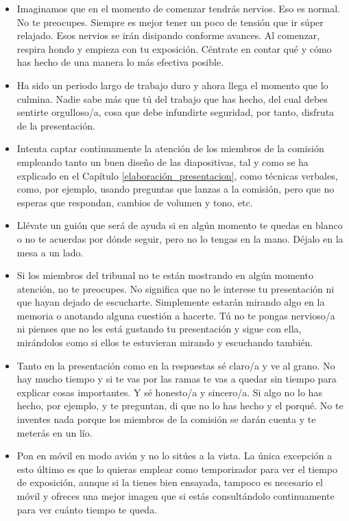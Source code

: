 \begin{itemize}
    \item Imaginamos que en el momento de comenzar tendrás nervios. Eso es normal. No te preocupes. Siempre es mejor tener un poco de tensión que ir súper relajado. Esos nervios se irán disipando conforme avances. Al comenzar, respira hondo y empieza con tu exposición. Céntrate en contar qué y cómo has hecho de una manera lo más efectiva posible.

    \item Ha sido un periodo largo de trabajo duro y ahora llega el momento que lo culmina. Nadie sabe más que tú del trabajo que has hecho, del cual debes sentirte orgulloso/a, cosa que debe infundirte seguridad, por tanto, disfruta de la presentación. 

    \item Intenta captar continuamente la atención de los miembros de la comisión empleando tanto un buen diseño de las diapositivas, tal y como se ha explicado en el Capítulo \ref{elaboración_presentacion}, como técnicas verbales, como, por ejemplo, usando preguntas que lanzas a la comisión, pero que no esperas que respondan, cambios de volumen y tono, etc.

    \item Llévate un guión que será de ayuda si en algún momento te quedas en blanco o no te acuerdas por dónde seguir, pero no lo tengas en la mano. Déjalo en la mesa a un lado.

    \item Si los miembros del tribunal no te están mostrando en algún momento atención, no te preocupes. No significa que no le interese tu presentación ni que hayan dejado de escucharte. Simplemente estarán mirando algo en la memoria o anotando alguna cuestión a hacerte. Tú no te pongas nervioso/a ni pienses que no les está gustando tu presentación y sigue con ella, mirándolos como si ellos te estuvieran mirando y escuchando también.

    \item Tanto en la presentación como en la respuestas sé claro/a y ve al grano. No hay mucho tiempo y si te vas por las ramas te vas a quedar sin tiempo para explicar cosas importantes. Y sé honesto/a y sincero/a. Si algo no lo has hecho, por ejemplo, y te preguntan, di que no lo has hecho y el porqué. No te inventes nada porque los miembros de la comisión se darán cuenta y te meterás en un lío.

    \item Pon en móvil en modo avión y no lo sitúes a la vista. La única excepción a esto último es que lo quieras emplear como temporizador para ver el tiempo de exposición, aunque si la tienes bien ensayada, tampoco es necesario el móvil y ofreces una mejor imagen que si estás consultándolo continuamente para ver cuánto tiempo te queda.
\end{itemize}

